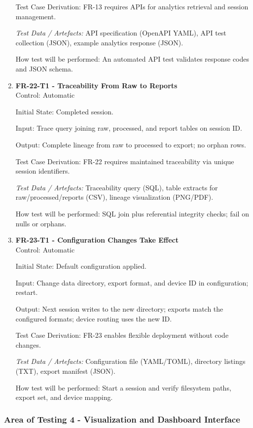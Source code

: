 \documentclass[12pt, titlepage]{article}
\begin{document}
\begin{enumerate}
Test Case Derivation: FR-13 requires APIs for analytics retrieval and session management.

\textit{Test Data / Artefacts:} API specification (OpenAPI YAML), API test collection (JSON), example analytics response (JSON).

How test will be performed: An automated API test validates response codes and JSON schema.

\item \textbf{FR-22-T1 - Traceability From Raw to Reports} \\

Control: Automatic

Initial State: Completed session.

Input: Trace query joining raw, processed, and report tables on session ID.

Output: Complete lineage from raw to processed to export; no orphan rows.

Test Case Derivation: FR-22 requires maintained traceability via unique session identifiers.

\textit{Test Data / Artefacts:} Traceability query (SQL), table extracts for raw/processed/reports (CSV), lineage visualization (PNG/PDF).

How test will be performed: SQL join plus referential integrity checks; fail on nulls or orphans.

\item \textbf{FR-23-T1 - Configuration Changes Take Effect} \\

Control: Automatic

Initial State: Default configuration applied.

Input: Change data directory, export format, and device ID in configuration; restart.

Output: Next session writes to the new directory; exports match the configured formats; device routing uses the new ID.

Test Case Derivation: FR-23 enables flexible deployment without code changes.

\textit{Test Data / Artefacts:} Configuration file (YAML/TOML), directory listings (TXT), export manifest (JSON).

How test will be performed: Start a session and verify filesystem paths, export set, and device mapping.

\end{enumerate}


\subsubsection{Area of Testing 4 - Visualization and Dashboard Interface}
\end{document}
